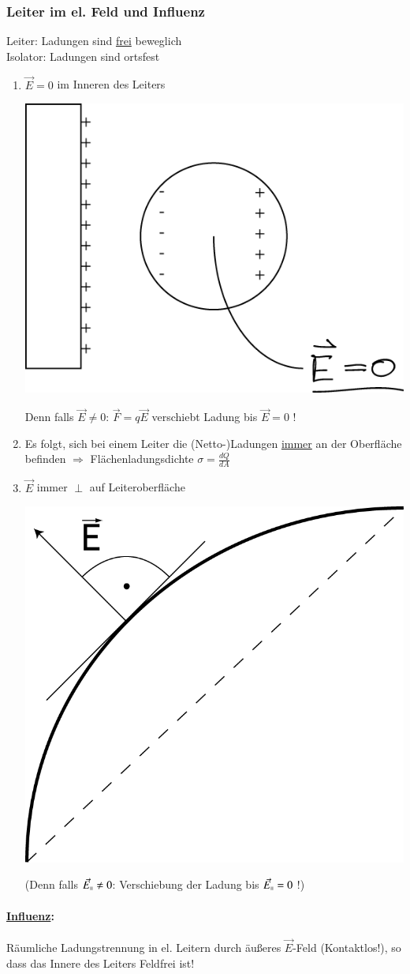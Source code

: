 \documentclass[11pt]{article}
\begin{document}
	\subsubsection{Leiter im el. Feld und Influenz}
	Leiter: Ladungen sind \underline{frei} beweglich  \\
	Isolator: Ladungen sind ortsfest
	\begin{enumerate}
		\item $ \vec{E} = 0 $ im Inneren des Leiters 
		\begin{center}
			\includegraphics[width=0.4\linewidth]{skizzen/14/14_4B6}
		\end{center} 
		Denn falls $ \vec{E} \neq 0 $: $ \vec{F} = q\vec{E} $ verschiebt Ladung bis $ \vec{E} = 0 $ ! 
		\item Es folgt, sich bei einem Leiter die (Netto-)Ladungen \underline{immer} an der Oberfläche befinden $ \Rightarrow $ Flächenladungsdichte $ \boxed{\sigma = \frac{dQ}{dA}} $
		\item $ \vec{E} $ immer $ \perp $ auf Leiteroberfläche
		\begin{center}
			\includegraphics[width=0.4\linewidth]{skizzen/14/14_4B7}
		\end{center}
		(Denn falls $ \vec{E}_{\shortparallel} \neq 0 $: Verschiebung der Ladung bis $ \vec{E}_{\shortparallel} = 0 $ !)

	\end{enumerate}
	\paragraph{\underline{Influenz}:} Räumliche Ladungstrennung in el. Leitern durch äu\ss{}eres $ \vec{E} $-Feld (Kontaktlos!), so dass das Innere des Leiters Feldfrei ist! 
	
\end{document}
